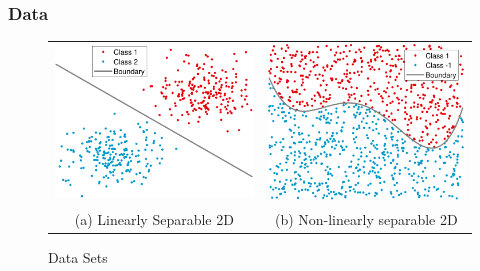 \documentclass[11pts]{beamer}
\begin{document}
\begin{frame}%
\frametitle{Data}

\begin{figure}[ht]
 \begin{tabular}{cc}
   \includegraphics[scale=0.4]{DATA/DATAS.pdf} &
    \includegraphics[scale=0.4]{DATA/CLASS_NLS.pdf}
   \\
    (a) Linearly Separable 2D & (b) Non-linearly separable 2D\\
 \end{tabular}
 \bigskip
 \caption{Data Sets}
\end{figure}
\end{frame}
\end{document}
